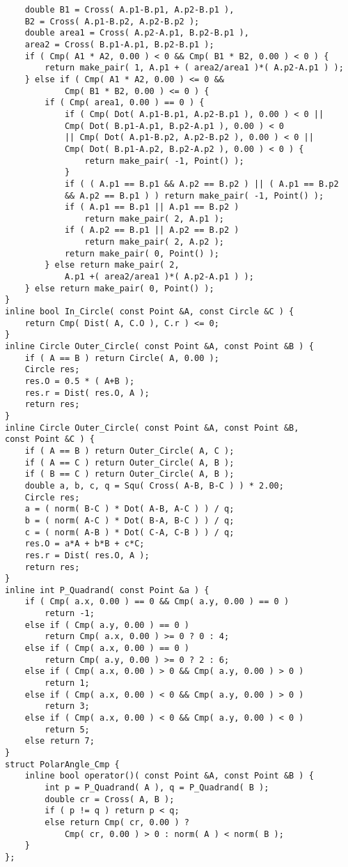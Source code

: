 \documentclass[10pt,twocolumn,oneside]{article}
\begin{document}
\begin{verbatim}
    double B1 = Cross( A.p1-B.p1, A.p2-B.p1 ),
    B2 = Cross( A.p1-B.p2, A.p2-B.p2 );
    double area1 = Cross( A.p2-A.p1, B.p2-B.p1 ),
    area2 = Cross( B.p1-A.p1, B.p2-B.p1 );
    if ( Cmp( A1 * A2, 0.00 ) < 0 && Cmp( B1 * B2, 0.00 ) < 0 ) {
        return make_pair( 1, A.p1 + ( area2/area1 )*( A.p2-A.p1 ) );
    } else if ( Cmp( A1 * A2, 0.00 ) <= 0 &&
            Cmp( B1 * B2, 0.00 ) <= 0 ) {
        if ( Cmp( area1, 0.00 ) == 0 ) {
            if ( Cmp( Dot( A.p1-B.p1, A.p2-B.p1 ), 0.00 ) < 0 ||
            Cmp( Dot( B.p1-A.p1, B.p2-A.p1 ), 0.00 ) < 0
            || Cmp( Dot( A.p1-B.p2, A.p2-B.p2 ), 0.00 ) < 0 ||
            Cmp( Dot( B.p1-A.p2, B.p2-A.p2 ), 0.00 ) < 0 ) {
                return make_pair( -1, Point() );
            }
            if ( ( A.p1 == B.p1 && A.p2 == B.p2 ) || ( A.p1 == B.p2
            && A.p2 == B.p1 ) ) return make_pair( -1, Point() );
            if ( A.p1 == B.p1 || A.p1 == B.p2 )
                return make_pair( 2, A.p1 );
            if ( A.p2 == B.p1 || A.p2 == B.p2 )
                return make_pair( 2, A.p2 );
            return make_pair( 0, Point() );
        } else return make_pair( 2,
            A.p1 +( area2/area1 )*( A.p2-A.p1 ) );
    } else return make_pair( 0, Point() );
}
inline bool In_Circle( const Point &A, const Circle &C ) {
    return Cmp( Dist( A, C.O ), C.r ) <= 0;
}
inline Circle Outer_Circle( const Point &A, const Point &B ) {
    if ( A == B ) return Circle( A, 0.00 );
    Circle res;
    res.O = 0.5 * ( A+B );
    res.r = Dist( res.O, A );
    return res;
}
inline Circle Outer_Circle( const Point &A, const Point &B,
const Point &C ) {
    if ( A == B ) return Outer_Circle( A, C );
    if ( A == C ) return Outer_Circle( A, B );
    if ( B == C ) return Outer_Circle( A, B );
    double a, b, c, q = Squ( Cross( A-B, B-C ) ) * 2.00;
    Circle res;
    a = ( norm( B-C ) * Dot( A-B, A-C ) ) / q;
    b = ( norm( A-C ) * Dot( B-A, B-C ) ) / q;
    c = ( norm( A-B ) * Dot( C-A, C-B ) ) / q;
    res.O = a*A + b*B + c*C;
    res.r = Dist( res.O, A );
    return res;
}
inline int P_Quadrand( const Point &a ) {
    if ( Cmp( a.x, 0.00 ) == 0 && Cmp( a.y, 0.00 ) == 0 )
        return -1;
    else if ( Cmp( a.y, 0.00 ) == 0 )
        return Cmp( a.x, 0.00 ) >= 0 ? 0 : 4;
    else if ( Cmp( a.x, 0.00 ) == 0 )
        return Cmp( a.y, 0.00 ) >= 0 ? 2 : 6;
    else if ( Cmp( a.x, 0.00 ) > 0 && Cmp( a.y, 0.00 ) > 0 )
        return 1;
    else if ( Cmp( a.x, 0.00 ) < 0 && Cmp( a.y, 0.00 ) > 0 )
        return 3;
    else if ( Cmp( a.x, 0.00 ) < 0 && Cmp( a.y, 0.00 ) < 0 )
        return 5;
    else return 7;
}
struct PolarAngle_Cmp {
    inline bool operator()( const Point &A, const Point &B ) {
        int p = P_Quadrand( A ), q = P_Quadrand( B );
        double cr = Cross( A, B );
        if ( p != q ) return p < q;
        else return Cmp( cr, 0.00 ) ?
            Cmp( cr, 0.00 ) > 0 : norm( A ) < norm( B );
    }
};
\end{verbatim}
\end{document}
